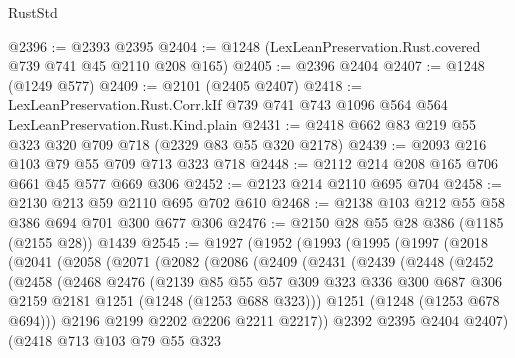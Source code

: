 \begin{lexlean}{RustStd}
\begin{coremodule}
@2396 := @2393 @2395
@2404 := @1248 (LexLeanPreservation.Rust.covered @739 @741 @45 @2110 @208 @165)
@2405 := @2396 @2404
@2407 := @1248 (@1249 @577)
@2409 := @2101 (@2405 @2407)
@2418 := LexLeanPreservation.Rust.Corr.kIf
    @739
    @741
    @743
    @1096
    @564
    @564
    LexLeanPreservation.Rust.Kind.plain
@2431 := @2418 @662 @83 @219 @55 @323 @320 @709 @718 (@2329 @83 @55 @320 @2178)
@2439 := @2093 @216 @103 @79 @55 @709 @713 @323 @718
@2448 := @2112 @214 @208 @165 @706 @661 @45 @577 @669 @306
@2452 := @2123 @214 @2110 @695 @704
@2458 := @2130 @213 @59 @2110 @695 @702 @610
@2468 := @2138 @103 @212 @55 @58 @386 @694 @701 @300 @677 @306
@2476 := @2150 @28 @55 @28 @386 (@1185 (@2155 @28)) @1439
@2545 := @1927
    (@1952
      (@1993
        (@1995
          (@1997
            (@2018
              (@2041
                (@2058
                  (@2071
                    (@2082
                      (@2086
                        (@2409
                          (@2431
                            (@2439
                              (@2448
                                (@2452
                                  (@2458
                                    (@2468
                                      @2476
                                      (@2139
                                        @85
                                        @55
                                        @57
                                        @309
                                        @323
                                        @336
                                        @300
                                        @687
                                        @306
                                        @2159
                                        @2181
                                        @1251
                                        (@1248 (@1253 @688 @323)))
                                      @1251
                                      (@1248 (@1253 @678 @694)))
                                    @2196
                                    @2199
                                    @2202
                                    @2206
                                    @2211
                                    @2217))
                                @2392
                                @2395
                                @2404
                                @2407)
                              (@2418
                                @713
                                @103
                                @79
                                @55
                                @323

\end{coremodule}
\end{lexlean}
